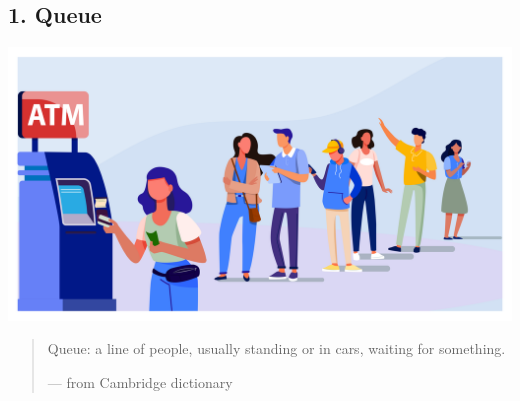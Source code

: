 \documentclass[aspectratio=169, 14pt]{beamer}
\begin{document}
{
    \begin{frame}
        \section{\textcolor{darkmidnightblue}{1. Queue}}
    \end{frame}
}

\begin{frame}

   \begin{center}
    \includegraphics[height=.5\paperheight]{week4/atm}
   \end{center} 
   \begin{quote}
    Queue: a line of people, usually standing or in cars, waiting for something.
    \begin{flushright}
        --- from Cambridge dictionary
    \end{flushright}
\end{quote}
\end{frame}
\end{document}
